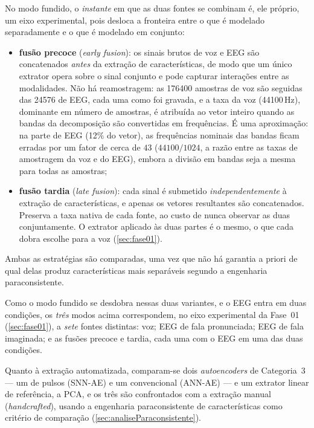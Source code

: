 		\par No modo fundido, o \emph{instante} em que as duas fontes se combinam é, ele próprio, um eixo experimental, pois desloca a fronteira entre o que é modelado separadamente e o que é modelado em conjunto:
		\begin{itemize}
			\item \textbf{fusão precoce} (\textit{early fusion}): os sinais brutos de voz e EEG são concatenados \emph{antes} da extração de características, de modo que um único extrator opera sobre o sinal conjunto e pode capturar interações entre as modalidades. Não há reamostragem: as 176400 amostras de voz são seguidas das 24576 de \ac{EEG}, cada uma como foi gravada, e a taxa da voz (44100\,Hz), dominante em número de amostras, é atribuída ao vetor inteiro quando as bandas da decomposição são convertidas em frequências. É uma aproximação: na parte de \ac{EEG} (12\% do vetor), as frequências nominais das bandas ficam erradas por um fator de cerca de $43$ ($44100/1024$, a razão entre as taxas de amostragem da voz e do \ac{EEG}), embora a divisão em bandas seja a mesma para todas as amostras;
			\item \textbf{fusão tardia} (\textit{late fusion}): cada sinal é submetido \emph{independentemente} à extração de características, e apenas os vetores resultantes são concatenados. Preserva a taxa nativa de cada fonte, ao custo de nunca observar as duas conjuntamente. O extrator aplicado às duas partes é o mesmo, o que cada dobra escolhe para a voz (\autoref{sec:fase01}).
		\end{itemize}
		\par Ambas as estratégias são comparadas, uma vez que não há garantia a priori de qual delas produz características mais separáveis segundo a engenharia paraconsistente.

		\par Como o modo fundido se desdobra nessas duas variantes, e o \ac{EEG} entra em duas condições, os \emph{três} modos acima correspondem, no eixo experimental da Fase~01 (\autoref{sec:fase01}), a \emph{sete} fontes distintas: voz; \ac{EEG} de fala pronunciada; \ac{EEG} de fala imaginada; e as fusões precoce e tardia, cada uma com o \ac{EEG} em uma das duas condições.

		\par Quanto à extração automatizada, comparam-se dois \textit{autoencoders} de Categoria~3 --- um de pulsos (\ac{SNN}-AE) e um convencional (\ac{ANN}-AE) --- e um extrator linear de referência, a \ac{PCA}, e os três são confrontados com a extração manual (\textit{handcrafted}), usando a engenharia paraconsistente de características como critério de comparação (\autoref{sec:analiseParaconsistente}).


